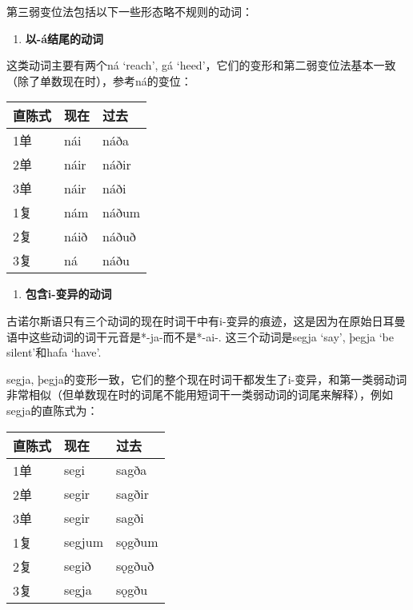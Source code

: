 第三弱变位法包括以下一些形态略不规则的动词：

\begin{enumerate}
  \def\labelenumi{\arabic{enumi})}
  \item
        \textbf{以-á结尾的动词}
\end{enumerate}

这类动词主要有两个ná `reach', gá
`heed'，它们的变形和第二弱变位法基本一致（除了单数现在时），参考ná的变位：

\begin{longtable}{lll}
  \toprule
  直陈式 & 现在 & 过去  \\
  \midrule
  \endhead
  \bottomrule
  \endfoot
  1单    & nái  & náða  \\
  2单    & náir & náðir \\
  3单    & náir & náði  \\
  1复    & nám  & náðum \\
  2复    & náið & náðuð \\
  3复    & ná   & náðu  \\
\end{longtable}

\begin{enumerate}
  \def\labelenumi{\arabic{enumi})}
  \setcounter{enumi}{1}
  \item
        \textbf{包含i-变异的动词}
\end{enumerate}

古诺尔斯语只有三个动词的现在时词干中有i-变异的痕迹，这是因为在原始日耳曼语中这些动词的词干元音是*-ja-而不是*-ai-.
这三个动词是segja `say', þegja `be silent'和hafa `have'.

segja,
þegja的变形一致，它们的整个现在时词干都发生了i-变异，和第一类弱动词非常相似（但单数现在时的词尾不能用短词干一类弱动词的词尾来解释），例如segja的直陈式为：

\begin{longtable}{lll}
  \toprule
  直陈式 & 现在   & 过去   \\
  \midrule
  \endhead
  \bottomrule
  \endfoot
  1单    & segi   & sagða  \\
  2单    & segir  & sagðir \\
  3单    & segir  & sagði  \\
  1复    & segjum & sǫgðum \\
  2复    & segið  & sǫgðuð \\
  3复    & segja  & sǫgðu  \\
\end{longtable}

